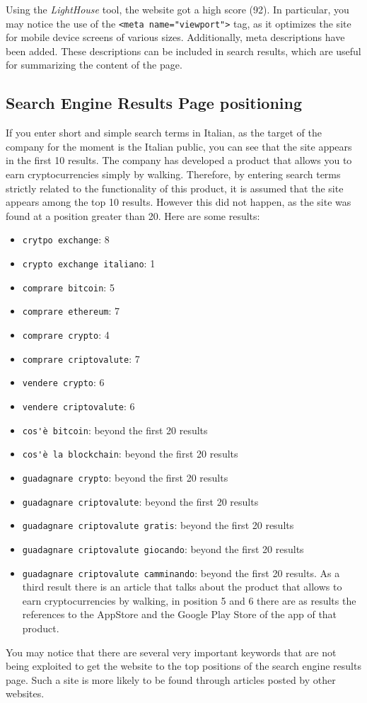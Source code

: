 Using the \textit{LightHouse} tool, the website got a high score (92). In 
particular, you may notice the use of the \verb|<meta name="viewport">| 
tag, as it optimizes the site for mobile device screens of various sizes. 
Additionally, meta descriptions have been added. These descriptions can be 
included in search results, which are useful for summarizing the content of 
the page.

\subsection{Search Engine Results Page positioning}

If you enter short and simple search terms in Italian, as the target of 
the company for the moment is the Italian public, you can see that the 
site appears in the first 10 results. The company has developed a product 
that allows you to earn cryptocurrencies simply by walking. Therefore, by 
entering search terms strictly related to the functionality of this 
product, it is assumed that the site appears among the top 10 results. 
However this did not happen, as the site was found at a position greater 
than 20. Here are some results:
\begin{itemize}
  \item \verb|crytpo exchange|: 8
  \item \verb|crypto exchange italiano|: 1
  \item \verb|comprare bitcoin|: 5
  \item \verb|comprare ethereum|: 7
  \item \verb|comprare crypto|: 4
  \item \verb|comprare criptovalute|: 7
  \item \verb|vendere crypto|: 6
  \item \verb|vendere criptovalute|: 6
  \item \verb|cos'è bitcoin|: beyond the first 20 results
  \item \verb|cos'è la blockchain|: beyond the first 20 results
  \item \verb|guadagnare crypto|: beyond the first 20 results
  \item \verb|guadagnare criptovalute|: beyond the first 20 results
  \item \verb|guadagnare criptovalute gratis|: beyond the first 20 results
  \item \verb|guadagnare criptovalute giocando|: beyond the first 20 results
  \item \verb|guadagnare criptovalute camminando|: beyond the first 20 
  results. As a third result there is an article that talks about the 
  product that allows to earn cryptocurrencies by walking, in position 
  5 and 6 there are as results the references to the AppStore and the 
  Google Play Store of the app of that product.
\end{itemize}

You may notice that there are several very important keywords that are not 
being exploited to get the website to the top positions of the search 
engine results page. Such a site is more likely to be found through 
articles posted by other websites.